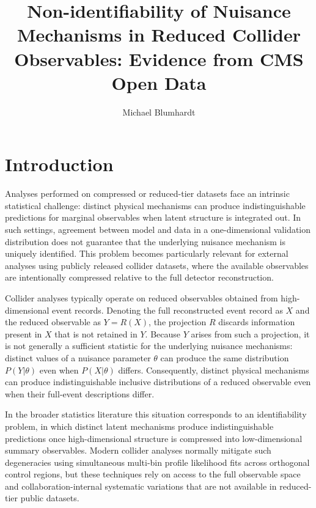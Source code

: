 \documentclass[a4paper,11pt]{article}
\title{Non-identifiability of Nuisance Mechanisms in Reduced Collider
  Observables: Evidence from CMS Open Data}
\author{Michael Blumhardt}
\affiliation{Independent Researcher}
\begin{document}
\maketitle
\flushbottom

\section{Introduction}
\label{sec:intro}

Analyses performed on compressed or reduced-tier datasets face an intrinsic
statistical challenge: distinct physical mechanisms can produce
indistinguishable predictions for marginal observables when latent structure
is integrated out.
In such settings, agreement between model and data in a one-dimensional
validation distribution does not guarantee that the underlying nuisance
mechanism is uniquely identified.
This problem becomes particularly relevant for external analyses using
publicly released collider datasets, where the available observables are
intentionally compressed relative to the full detector reconstruction.

Collider analyses typically operate on reduced observables obtained from
high-dimensional event records.
Denoting the full reconstructed event record as $X$ and the reduced
observable as $Y = R(X)$, the projection $R$ discards information present
in $X$ that is not retained in $Y$.
Because $Y$ arises from such a projection, it is not generally a sufficient
statistic for the underlying nuisance mechanisms: distinct values of a
nuisance parameter $\theta$ can produce the same distribution $P(Y|\theta)$
even when $P(X|\theta)$ differs.
Consequently, distinct physical mechanisms can produce indistinguishable
inclusive distributions of a reduced observable even when their full-event
descriptions differ.

In the broader statistics literature this situation corresponds to an
identifiability problem, in which distinct latent mechanisms produce
indistinguishable predictions once high-dimensional structure is compressed
into low-dimensional summary observables.
Modern collider analyses normally mitigate such degeneracies using
simultaneous multi-bin profile likelihood fits across orthogonal control
regions, but these techniques rely on access to the full observable space and
collaboration-internal systematic variations that are not available in
reduced-tier public datasets.
\end{document}
